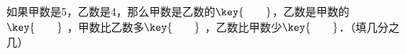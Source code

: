 如果甲数是5，乙数是4，那么甲数是乙数的$\key{\qquad}$，乙数是甲数的$\key{\qquad}$ ，甲数比乙数多$\key{\qquad}$ ，乙数比甲数少$\key{\qquad}$．（填几分之几）